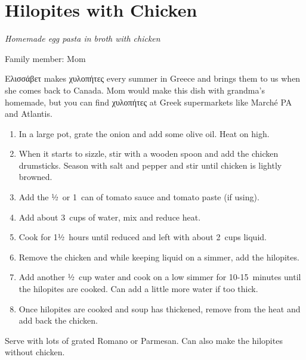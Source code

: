 \chapter{Hilopites with Chicken}
\label{ch:hilopites}


\textit{Homemade egg pasta in broth with chicken}

Family member: Mom

 \textgreek{Ελισσάβετ} makes \textgreek{χυλοπήτες} every summer in Greece and brings them to us when she comes back to Canada. Mom would make this dish with grandma's homemade, but you can find \textgreek{χυλοπήτες} at Greek supermarkets like Marché PA and Atlantis.

\begin{enumerate}
    \item In a large pot, grate the onion and add some olive oil. Heat on high.
    \item When it starts to sizzle, stir with a wooden spoon and add the chicken drumsticks. Season with salt and pepper and stir until chicken is lightly browned.
    \item Add the ½~or 1~can of tomato sauce and tomato paste (if using).
    \item Add about 3~cups of water, mix and reduce heat.
    \item Cook for 1½~hours until reduced and left with about 2~cups liquid.
    \item Remove the chicken and while keeping liquid on a simmer, add the hilopites.
    \item Add another ½~cup water and cook on a low simmer for 10-15~minutes until the hilopites are cooked. Can add a little more water if too thick.
    \item Once hilopites are cooked and soup has thickened, remove from the heat and add back the chicken.
\end{enumerate}

Serve with lots of grated Romano or Parmesan. Can also make the hilopites without chicken.
